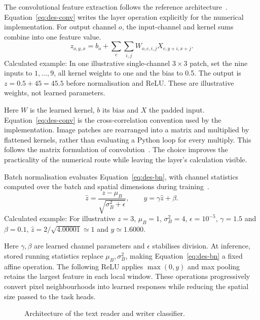 The convolutional feature extraction follows the reference architecture~\cite[pp.~4--5]{kizilirmak2023}. Equation~\ref{eq:des-conv} writes the layer operation explicitly for the numerical implementation. For output channel $o$, the input-channel and kernel sums combine into one feature value.
\begin{equation}
z_{o,y,x}=b_o+\sum_c\sum_{i,j}W_{o,c,i,j}X_{c,y+i,x+j}.
\label{eq:des-conv}
\end{equation}
Calculated example: In one illustrative single-channel $3\times3$ patch, set the nine inputs to $1,\ldots,9$, all kernel weights to one and the bias to 0.5. The output is $z=0.5+45=45.5$ before normalisation and ReLU. These are illustrative weights, not learned parameters.

Here $W$ is the learned kernel, $b$ its bias and $X$ the padded input. Equation~\ref{eq:des-conv} is the cross-correlation convention used by the implementation. Image patches are rearranged into a matrix and multiplied by flattened kernels, rather than evaluating a Python loop for every multiply. This follows the matrix formulation of convolution~\cite[page to verify]{chellapilla2006}. The choice improves the practicality of the numerical route while leaving the layer's calculation visible.

Batch normalisation evaluates Equation~\ref{eq:des-bn}, with channel statistics computed over the batch and spatial dimensions during training~\cite[PDF pp.~4--5, Alg.~1]{ioffe2015}.
\begin{equation}
\widehat z=\frac{z-\mu_B}{\sqrt{\sigma_B^2+\epsilon}},\qquad
y=\gamma\widehat z+\beta.
\label{eq:des-bn}
\end{equation}
Calculated example: For illustrative $z=3$, $\mu_B=1$, $\sigma_B^2=4$, $\epsilon=10^{-5}$, $\gamma=1.5$ and $\beta=0.1$, $\widehat z=2/\sqrt{4.00001}\simeq1$ and $y\simeq1.6000$.

Here $\gamma,\beta$ are learned channel parameters and $\epsilon$ stabilises division. At inference, stored running statistics replace $\mu_B,\sigma_B^2$, making Equation~\ref{eq:des-bn} a fixed affine operation. The following ReLU applies $\max(0,y)$ and max pooling retains the largest feature in each local window. These operations progressively convert pixel neighbourhoods into learned responses while reducing the spatial size passed to the task heads.

\begin{figure}[!htbp]\centering
{}
\caption{Architecture of the text reader and writer classifier.}
\label{fig:des-network}
\end{figure}


